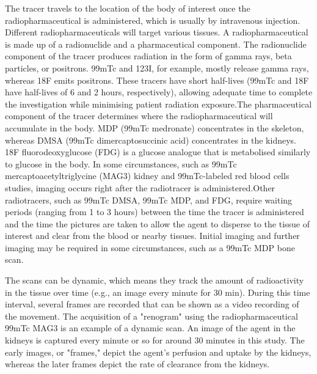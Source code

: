 \documentclass[12pt]{article}
\begin{document}
\par
The tracer travels to the location of the body of interest once the radiopharmaceutical is administered, which is usually by intravenous injection. Different radiopharmaceuticals will target various tissues.
A radiopharmaceutical is made up of a radionuclide and a pharmaceutical component. The radionuclide component of the tracer produces radiation in the form of gamma rays, beta particles, or positrons. 99mTc and 123I, for example, mostly release gamma rays, whereas 18F emits positrons. These tracers have short half-lives (99mTc and 18F have half-lives of 6 and 2 hours, respectively), allowing adequate time to complete the investigation while minimising patient radiation exposure.The pharmaceutical component of the tracer determines where the radiopharmaceutical will accumulate in the body. MDP (99mTc medronate) concentrates in the skeleton, whereas DMSA (99mTc dimercaptosuccinic acid) concentrates in the kidneys. 18F fluorodeoxyglucose (FDG) is a glucose analogue that is metabolised similarly to glucose in the body. In some circumstances, such as 99mTc mercaptoacetyltriglycine (MAG3) kidney and 99mTc-labeled red blood cells studies, imaging occurs right after the radiotracer is administered.Other radiotracers, such as 99mTc DMSA, 99mTc MDP, and FDG, require waiting periods (ranging from 1 to 3 hours) between the time the tracer is administered and the time the pictures are taken to allow the agent to disperse to the tissue of interest and clear from the blood or nearby tissues. Initial imaging and further imaging may be required in some circumstances, such as a 99mTc MDP bone scan.
\par
The scans can be dynamic, which means they track the amount of radioactivity in the tissue over time (e.g., an image every minute for 30 min). During this time interval, several frames are recorded that can be shown as a video recording of the movement. The acquisition of a "renogram" using the radiopharmaceutical 99mTc MAG3 is an example of a dynamic scan. An image of the agent in the kidneys is captured every minute or so for around 30 minutes in this study. The early images, or "frames," depict the agent's perfusion and uptake by the kidneys, whereas the later frames depict the rate of clearance from the kidneys.
\end{document}
